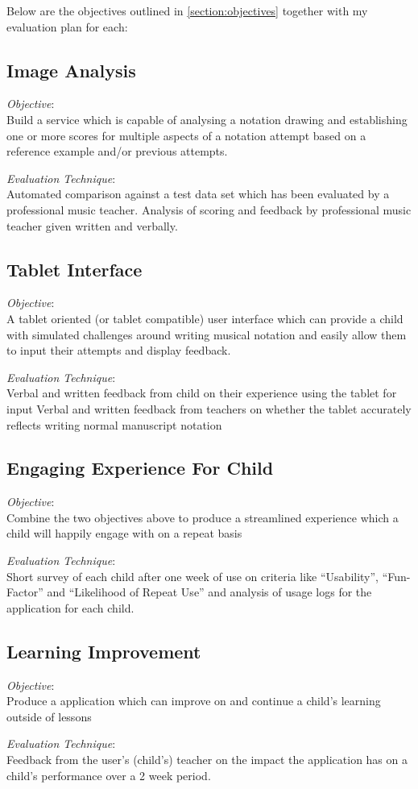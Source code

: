 Below are the objectives outlined in \cref{section:objectives} together with my evaluation plan for each:

\subsection{Image Analysis}

\emph{Objective}: \\
Build a service which is capable of analysing a notation drawing and establishing one or more scores for multiple aspects of a notation attempt based on a reference example and/or previous attempts.

\emph{Evaluation Technique}: \\
Automated comparison against a test data set which has been evaluated by a professional music teacher.
Analysis of scoring and feedback by professional music teacher given written and verbally.

\subsection{Tablet Interface}

\emph{Objective}: \\
A tablet oriented (or tablet compatible) user interface which can provide a child with simulated challenges around writing musical notation and easily allow them to input their attempts and display feedback.

\emph{Evaluation Technique}: \\
Verbal and written feedback from child on their experience using the tablet for input
Verbal and written feedback from teachers on whether the tablet accurately reflects writing normal manuscript notation

\subsection{Engaging Experience For Child}

\emph{Objective}: \\
Combine the two objectives above to produce a streamlined experience which a child will happily engage with on a repeat basis

\emph{Evaluation Technique}: \\
Short survey of each child after one week of use on criteria like ``Usability'', ``Fun-Factor'' and ``Likelihood of Repeat Use'' and analysis of usage logs for the application for each child.

\subsection{Learning Improvement}

\emph{Objective}: \\
Produce a application which can improve on and continue a child's learning outside of lessons

\emph{Evaluation Technique}: \\
Feedback from the user's (child's) teacher on the impact the application has on a child's performance over a 2 week period.
